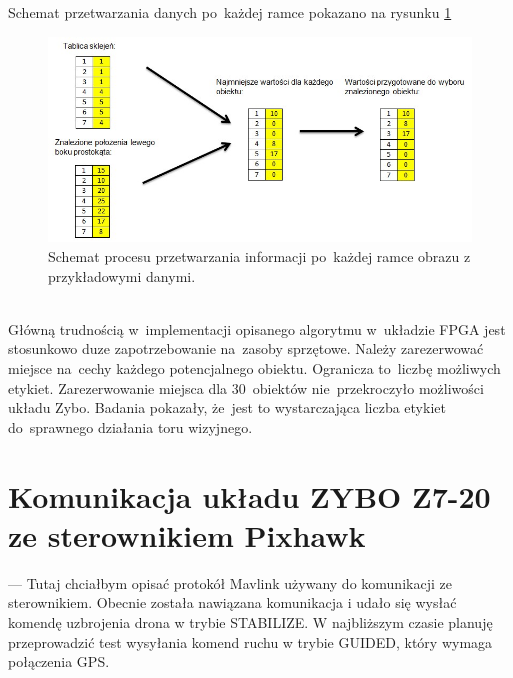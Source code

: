 Schemat przetwarzania danych po~każdej ramce pokazano na rysunku \ref{fig:ind_schemat}
\begin{figure}[h]
	\centering
	\includegraphics[width=\textwidth]{ind_schemat.jpg}
	\caption{Schemat procesu przetwarzania informacji po~każdej ramce obrazu z przykładowymi danymi.}
	\label{fig:ind_schemat}
\end{figure}
\\Główną trudnością w~implementacji opisanego algorytmu w~układzie FPGA jest stosunkowo duze zapotrzebowanie na~zasoby sprzętowe. Należy zarezerwować miejsce na~cechy każdego potencjalnego obiektu. Ogranicza to~liczbę możliwych etykiet. Zarezerwowanie miejsca dla 30~obiektów nie~przekroczyło możliwości układu Zybo. Badania pokazały, że~jest to wystarczająca liczba etykiet do~sprawnego działania toru wizyjnego.
\section{Komunikacja układu ZYBO Z7-20 ze sterownikiem Pixhawk}
\label{sec:Komunikacja układu ZYBO Z7-20 ze sterownikiem Pixhawk} 
--- Tutaj chciałbym opisać protokół Mavlink używany do komunikacji ze sterownikiem. Obecnie została nawiązana komunikacja i udało się wysłać komendę uzbrojenia drona w trybie STABILIZE. W najbliższym czasie planuję przeprowadzić test wysyłania komend ruchu w trybie GUIDED, który wymaga połączenia GPS.
